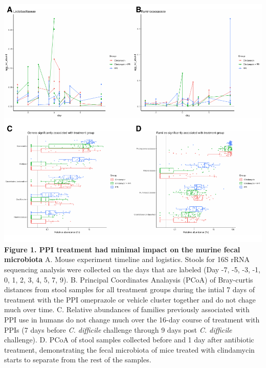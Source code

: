 \documentclass[11pt,]{article}
\begin{document}
\includegraphics{figure_1.pdf} \textbf{Figure 1. PPI treatment had
minimal impact on the murine fecal microbiota} A. Mouse experiment
timeline and logistics. Stools for 16S rRNA sequencing analysis were
collected on the days that are labeled (Day -7, -5, -3, -1, 0, 1, 2, 3,
4, 5, 7, 9). B. Principal Coordinates Analaysis (PCoA) of Bray-curtis
distances from stool samples for all treatment groups during the intial
7 days of treatment with the PPI omeprazole or vehicle cluster together
and do not chage much over time. C. Relative abundances of families
previously associated with PPI use in humans do not change much over the
16-day course of treatment with PPIs (7 days before \emph{C. difficile}
challenge through 9 days post \emph{C. difficile} challenge). D. PCoA of
stool samples collected before and 1 day after antibiotic treatment,
demonstrating the fecal microbiota of mice treated with clindamycin
starts to separate from the rest of the samples.

\newpage
\end{document}
